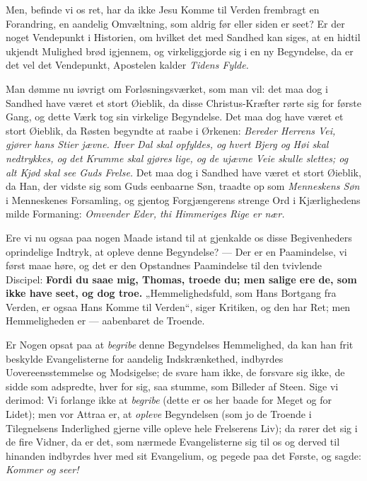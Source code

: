 \documentclass[12pt,a4paper]{book}
\begin{document}
Men, befinde vi os ret, har da ikke Jesu Komme til Verden frembragt en
Forandring, en aandelig Omvæltning, som aldrig før eller siden er seet? Er der
noget Vendepunkt i Historien, om hvilket det med Sandhed kan siges, at en hidtil
ukjendt Mulighed brød igjennem, og virkeliggjorde sig i en ny Begyndelse, da er
det vel det Vendepunkt, Apostelen kalder \emph{Tidens Fylde.}

Man dømme nu iøvrigt om Forløsningsværket, som man vil: det maa dog i Sandhed
have været et stort Øieblik, da disse Christus-Kræfter rørte sig for første Gang,
og dette Værk tog sin
virkelige Begyndelse. Det maa dog have været et stort Øieblik, da Røsten
begyndte at raabe i Ørkenen: \emph{Bereder Herrens Vei, gjører hans Stier
jævne. Hver Dal skal opfyldes, og hvert Bjerg og Høi skal nedtrykkes, og det
Krumme skal gjøres lige, og de ujævne Veie skulle slettes; og alt Kjød skal see
Guds Frelse.} Det maa dog i Sandhed have været et stort Øieblik, da Han, der
vidste sig som Guds eenbaarne Søn, traadte op som \emph{Menneskens Søn} i
Menneskenes Forsamling, og gjentog Forgjængerens strenge Ord i Kjærlighedens
milde Formaning: \emph{Omvender Eder, thi Himmeriges Rige er nær.}

Ere vi nu ogsaa paa nogen Maade istand til at gjenkalde os disse Begivenheders
oprindelige Indtryk, at opleve denne Begyndelse? --- Der er en Paamindelse, vi
først maae høre, og det er den Opstandnes Paamindelse til den tvivlende
Discipel: \textbf{Fordi du saae mig, Thomas, troede du; men salige ere de, som
ikke have seet, og dog troe.} „Hemmelighedsfuld, som Hans Bortgang fra Verden,
er ogsaa Hans Komme til Verden“, siger Kritiken, og den har Ret; men
Hemmeligheden er --- aabenbaret de Troende.

Er Nogen opsat paa at \emph{begribe} denne Begyndelses Hemmelighed, da kan han
frit beskylde Evangelisterne for aandelig Indskrænkethed, indbyrdes
Uovereensstemmelse og Modsigelse; de svare ham ikke, de forsvare sig ikke, de
sidde som adspredte, hver for sig, saa stumme, som Billeder af Steen. Sige vi
derimod: Vi forlange ikke at \emph{begribe} (dette er os her baade for Meget og
for Lidet); men vor Attraa er, at \emph{opleve} Begyndelsen (som jo de Troende i
Tilegnelsens Inderlighed gjerne ville opleve hele Frelserens Liv); da rører det
sig i de fire Vidner, da er det, som nærmede Evangelisterne sig til os og derved
til hinanden indbyrdes
hver med sit Evangelium, og pegede paa det Første, og sagde: \emph{Kommer og
seer!}
\end{document}
